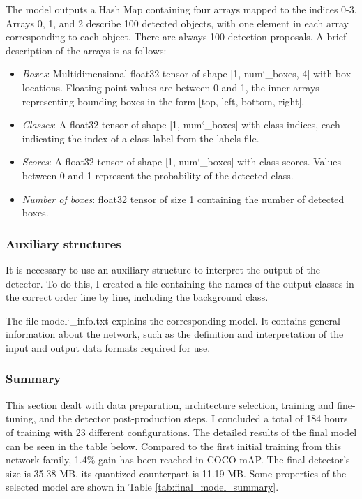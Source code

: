 The model outputs a Hash Map containing four arrays mapped to the indices 0-3. Arrays 0, 1, and 2 describe 100 detected objects, with one element in each array corresponding to each object. There are always 100 detection proposals. A brief description of the arrays is as follows:

\begin{itemize}
  \item \textit{Boxes}: Multidimensional float32 tensor of shape [1, num\char`_boxes, 4] with box locations. Floating-point values are between 0 and 1, the inner arrays representing bounding boxes in the form [top, left, bottom, right].
  \item \textit{Classes}: A float32 tensor of shape [1, num\char`_boxes] with class indices, each indicating the index of a class label from the labels file.
  \item \textit{Scores}: A float32 tensor of shape [1, num\char`_boxes] with class scores. Values between 0 and 1 represent the probability of the detected class.
  \item \textit{Number of boxes}: float32 tensor of size 1 containing the number of detected boxes.
\end{itemize}

\subsubsection{Auxiliary structures}

It is necessary to use an auxiliary structure to interpret the output of the detector. To do this, I created a file containing the names of the output classes in the correct order line by line, including the background class.

The file model\char`_info.txt explains the corresponding model. It contains general information about the network, such as the definition and interpretation of the input and output data formats required for use.

\subsubsection{Summary}

This section dealt with data preparation, architecture selection, training and fine-tuning, and the detector post-production steps. I concluded a total of 184 hours of training with 23 different configurations. The detailed results of the final model can be seen in the table below. Compared to the first initial training from this network family, 1.4\% gain has been reached in COCO mAP. The final detector's size is 35.38 MB, its quantized counterpart is 11.19 MB. Some properties of the selected model are shown in Table \ref{tab:final_model_summary}.

